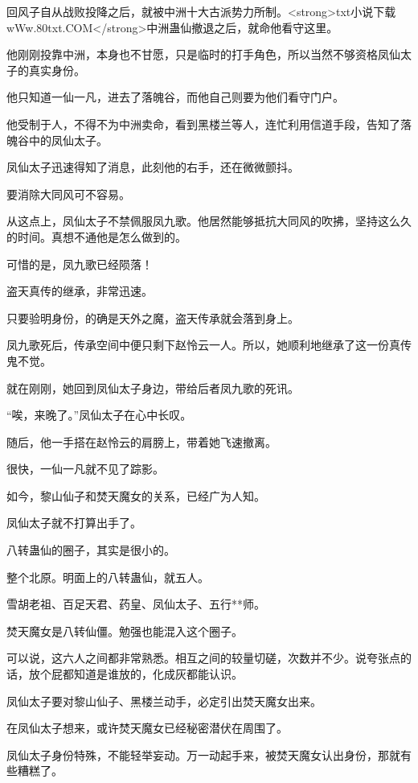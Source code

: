 
\begin{this_body}

回风子自从战败投降之后，就被中洲十大古派势力所制。<strong>txt小说下载wWw.80txt.COM</strong>中洲蛊仙撤退之后，就命他看守这里。

他刚刚投靠中洲，本身也不甘愿，只是临时的打手角色，所以当然不够资格凤仙太子的真实身份。

他只知道一仙一凡，进去了落魄谷，而他自己则要为他们看守门户。

他受制于人，不得不为中洲卖命，看到黑楼兰等人，连忙利用信道手段，告知了落魄谷中的凤仙太子。

凤仙太子迅速得知了消息，此刻他的右手，还在微微颤抖。

要消除大同风可不容易。

从这点上，凤仙太子不禁佩服凤九歌。他居然能够抵抗大同风的吹拂，坚持这么久的时间。真想不通他是怎么做到的。

可惜的是，凤九歌已经陨落！

盗天真传的继承，非常迅速。

只要验明身份，的确是天外之魔，盗天传承就会落到身上。

凤九歌死后，传承空间中便只剩下赵怜云一人。所以，她顺利地继承了这一份真传鬼不觉。

就在刚刚，她回到凤仙太子身边，带给后者凤九歌的死讯。

“唉，来晚了。”凤仙太子在心中长叹。

随后，他一手搭在赵怜云的肩膀上，带着她飞速撤离。

很快，一仙一凡就不见了踪影。

如今，黎山仙子和焚天魔女的关系，已经广为人知。

凤仙太子就不打算出手了。

八转蛊仙的圈子，其实是很小的。

整个北原。明面上的八转蛊仙，就五人。

雪胡老祖、百足天君、药皇、凤仙太子、五行**师。

焚天魔女是八转仙僵。勉强也能混入这个圈子。

可以说，这六人之间都非常熟悉。相互之间的较量切磋，次数并不少。说夸张点的话，放个屁都知道是谁放的，化成灰都能认识。

凤仙太子要对黎山仙子、黑楼兰动手，必定引出焚天魔女出来。

在凤仙太子想来，或许焚天魔女已经秘密潜伏在周围了。

凤仙太子身份特殊，不能轻举妄动。万一动起手来，被焚天魔女认出身份，那就有些糟糕了。


\end{this_body}
